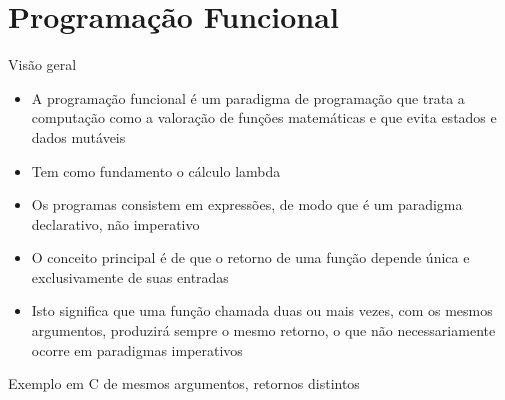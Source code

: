 \section{Programação Funcional}

\begin{frame}[fragile]{Visão geral}

    \begin{itemize}
        \item A programação funcional é um paradigma de programação que trata a computação como
            a valoração de funções matemáticas e que evita estados e dados mutáveis

        \item Tem como fundamento o cálculo lambda

        \item Os programas consistem em expressões, de modo que é um paradigma declarativo, não
            imperativo

        \item O conceito principal é de que o retorno de uma função depende única e exclusivamente
            de suas entradas

        \item Isto significa que uma função chamada duas ou mais vezes, com os mesmos argumentos, 
            produzirá sempre o mesmo retorno, o que não necessariamente ocorre em paradigmas
            imperativos

    \end{itemize}

\end{frame}

\begin{frame}[fragile]{Exemplo em C de mesmos argumentos, retornos distintos}
\end{frame}

